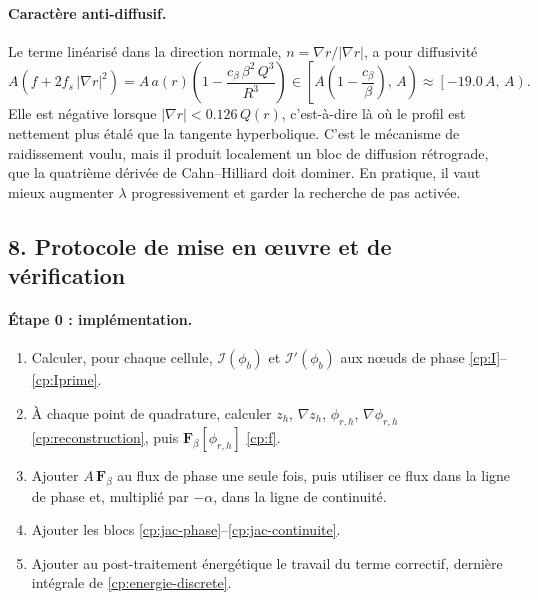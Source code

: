 \paragraph{Caractère anti-diffusif.} Le terme linéarisé dans la direction normale, $n=\nabla r/|\nabla r|$, a pour diffusivité
\begin{equation}
  A\left(f + 2f_s\,|\nabla r|^{2}\right) = A\,a(r)\left(1 - \frac{c_\beta\,\beta^{2}\,Q^{3}}{R^{3}}\right)
  \in \left[A\left(1-\frac{c_\beta}{\beta}\right),\,A\right) \approx \left[-19.0\,A,\,A\right).
\end{equation}
Elle est négative lorsque $|\nabla r| < 0.126\,Q(r)$, c'est-à-dire là où le profil est nettement plus étalé que la tangente hyperbolique. C'est le mécanisme de raidissement voulu, mais il produit localement un bloc de diffusion rétrograde, que la quatrième dérivée de Cahn--Hilliard doit dominer. En pratique, il vaut mieux augmenter $\lambda$ progressivement et garder la recherche de pas activée.

\subsection*{8. Protocole de mise en œuvre et de vérification}

\paragraph{Étape 0 : implémentation.}
\begin{enumerate}
  \item Calculer, pour chaque cellule, $\mathcal{I}(\phi_b)$ et $\mathcal{I}'(\phi_b)$ aux nœuds de phase \eqref{cp:I}--\eqref{cp:Iprime}.
  \item À chaque point de quadrature, calculer $z_h$, $\nabla z_h$, $\phi_{r,h}$, $\nabla\phi_{r,h}$ \eqref{cp:reconstruction}, puis $\mathbf{F}_\beta[\phi_{r,h}]$ \eqref{cp:f}.
  \item Ajouter $A\,\mathbf{F}_\beta$ au flux de phase une seule fois, puis utiliser ce flux dans la ligne de phase et, multiplié par $-\alpha$, dans la ligne de continuité.
  \item Ajouter les blocs \eqref{cp:jac-phase}--\eqref{cp:jac-continuite}.
  \item Ajouter au post-traitement énergétique le travail du terme correctif, dernière intégrale de \eqref{cp:energie-discrete}.
\end{enumerate}

